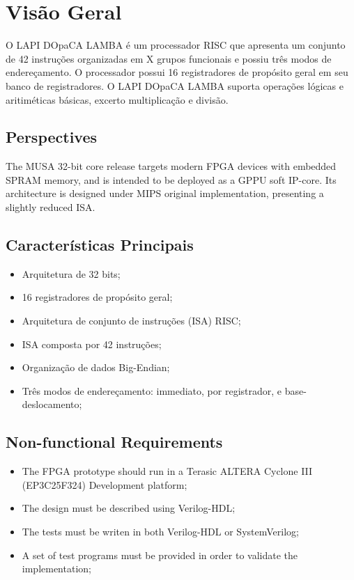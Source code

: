 \documentclass{article}
\begin{document}
  \newpage
  \section{Visão Geral}
  \label{sec:design_overview}
  O LAPI DOpaCA LAMBA é um processador RISC que apresenta um conjunto de 42 instruções organizadas em X grupos funcionais e possiu três modos de endereçamento. O processador possui 16 registradores de propósito geral em seu banco de registradores. O LAPI DOpaCA LAMBA suporta operações lógicas e aritiméticas básicas, excerto multiplicação e divisão. 
  
 \subsection{Perspectives}
    
  The MUSA 32-bit core release targets modern FPGA devices with embedded SPRAM memory, and is intended to be deployed as a GPPU soft IP-core. Its architecture is designed under MIPS original implementation, presenting a slightly reduced ISA.
  
  \subsection{Características Principais}
  
  \begin{itemize}
   \item Arquitetura de 32 bits;
   \item 16 registradores de propósito geral;
   \item Arquitetura de conjunto de instruções (ISA) RISC;
   \item ISA composta por 42 instruções;
   \item Organização de dados Big-Endian;
   \item Três modos de endereçamento: immediato, por registrador, e base-deslocamento;
   
  \end{itemize}

  \subsection{Non-functional Requirements}
  
  \begin{itemize}
   \item The FPGA prototype should run in a Terasic ALTERA Cyclone III (EP3C25F324) Development platform;
   \item The design must be described using Verilog-HDL;
   \item The tests must be writen in both Verilog-HDL or SystemVerilog;
   \item A set of test programs must be provided in order to validate the implementation;
  \end{itemize}
\end{document}
